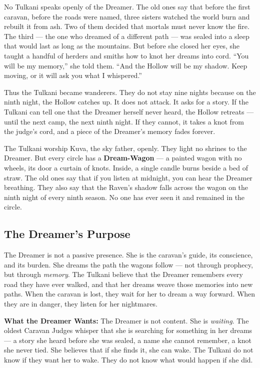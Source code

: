 No Tulkani speaks openly of the Dreamer. The old ones say that before the first caravan, before the roads were named, three sisters watched the world burn and rebuilt it from ash. Two of them decided that mortals must never know the fire. The third --- the one who dreamed of a different path --- was sealed into a sleep that would last as long as the mountains. But before she closed her eyes, she taught a handful of herders and smiths how to knot her dreams into cord. ``You will be my memory,'' she told them. ``And the Hollow will be my shadow. Keep moving, or it will ask you what I whispered.''

Thus the Tulkani became wanderers. They do not stay nine nights because on the ninth night, the Hollow catches up. It does not attack. It asks for a story. If the Tulkani can tell one that the Dreamer herself never heard, the Hollow retreats --- until the next camp, the next ninth night. If they cannot, it takes a knot from the judge's cord, and a piece of the Dreamer's memory fades forever.

The Tulkani worship Kuva, the sky father, openly. They light no shrines to the Dreamer. But every circle has a \textbf{Dream-Wagon} --- a painted wagon with no wheels, its door a curtain of knots. Inside, a single candle burns beside a bed of straw. The old ones say that if you listen at midnight, you can hear the Dreamer breathing. They also say that the Raven's shadow falls across the wagon on the ninth night of every ninth season. No one has ever seen it and remained in the circle.

\subsection*{The Dreamer's Purpose}
\label{subsec:tulkani-dreamer}

The Dreamer is not a passive presence. She is the caravan's guide, its conscience, and its burden. She dreams the path the wagons follow --- not through prophecy, but through \emph{memory}. The Tulkani believe that the Dreamer remembers every road they have ever walked, and that her dreams weave those memories into new paths. When the caravan is lost, they wait for her to dream a way forward. When they are in danger, they listen for her nightmares.

\textbf{What the Dreamer Wants:} The Dreamer is not content. She is \emph{waiting}. The oldest Caravan Judges whisper that she is searching for something in her dreams --- a story she heard before she was sealed, a name she cannot remember, a knot she never tied. She believes that if she finds it, she can wake. The Tulkani do not know if they want her to wake. They do not know what would happen if she did.

